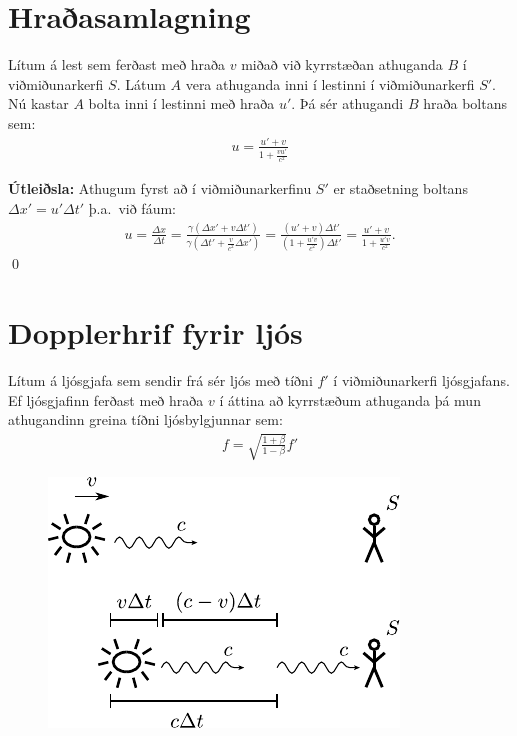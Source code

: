 \ifdefined \wholebook \else\documentclass[oneside]{book}\usepackage{EdlBook}\graphicspath{{figures/}}
\begin{document}
\newpage

\section{Hraðasamlagning}

\begin{tcolorbox}
\begin{theorem}
Lítum á lest sem ferðast með hraða $v$ miðað við kyrrstæðan athuganda $B$ í viðmiðunarkerfi $S$. Látum $A$ vera athuganda inni í lestinni í viðmiðunarkerfi $S'$. Nú kastar $A$ bolta inni í lestinni með hraða $u'$. Þá sér athugandi $B$ hraða boltans sem:
\begin{align*}
    u = \frac{u' + v}{1 + \frac{vu'}{c^2}} 
\end{align*}
\end{theorem}
\end{tcolorbox}


\textbf{Útleiðsla:} Athugum fyrst að í viðmiðunarkerfinu $S'$ er staðsetning boltans $\Delta x' = u' \Delta t'$ þ.a.~við fáum:
\begin{align*}
    u = \frac{\Delta x}{\Delta t} = \frac{\gamma \left( \Delta x' + v\Delta t' \right)}{\gamma \left( \Delta t' + \frac{v}{c^2}\Delta x' \right)} = \frac{(u' + v)\Delta t'}{\left(1 + \frac{u'v}{c^2}\right)\Delta t'} = \frac{u' + v}{1 + \frac{u'v}{c^2}}.
\end{align*}
\qed

\section{Dopplerhrif fyrir ljós}

\begin{tcolorbox}
\begin{theorem}
Lítum á ljósgjafa sem sendir frá sér ljós með tíðni $f'$ í viðmiðunarkerfi ljósgjafans. Ef ljósgjafinn ferðast með hraða $v$ í áttina að kyrrstæðum athuganda þá mun athugandinn greina tíðni ljósbylgjunnar sem:
\begin{align*}
    f = \sqrt{\frac{1 + \beta}{1 - \beta}} f'
\end{align*}
\end{theorem}
\end{tcolorbox}

\begin{figure}[H]
    \centering
    \includegraphics{figures/dopplerhrif-ljos.pdf}
\end{figure}
\end{document}
